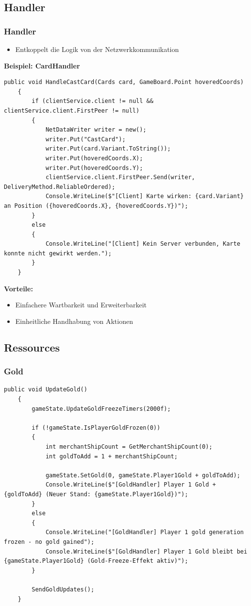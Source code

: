 \documentclass{beamer}
\begin{document}
\subsection{Handler}
\begin{frame}[fragile]
\frametitle{Handler}
  \begin{itemize}
    \item Entkoppelt die Logik von der Netzwerkkommunikation
  \end{itemize}
  \textbf{Beispiel: CardHandler}
  \begin{lstlisting}[language=CSharp, basicstyle=\ttfamily\tiny, breaklines=true]
    public void HandleCastCard(Cards card, GameBoard.Point hoveredCoords)
    {
        if (clientService.client != null && clientService.client.FirstPeer != null)
        {
            NetDataWriter writer = new();
            writer.Put("CastCard");
            writer.Put(card.Variant.ToString());
            writer.Put(hoveredCoords.X);
            writer.Put(hoveredCoords.Y);
            clientService.client.FirstPeer.Send(writer, DeliveryMethod.ReliableOrdered);
            Console.WriteLine($"[Client] Karte wirken: {card.Variant} an Position ({hoveredCoords.X}, {hoveredCoords.Y})");
        }
        else
        {
            Console.WriteLine("[Client] Kein Server verbunden, Karte konnte nicht gewirkt werden.");
        }
    }
  \end{lstlisting}
  \textbf{Vorteile:}
  \begin{itemize}
    \item Einfachere Wartbarkeit und Erweiterbarkeit
    \item Einheitliche Handhabung von Aktionen
  \end{itemize} 
\end{frame}

\subsection{Ressources}
\begin{frame}[fragile]
\frametitle{Gold}
\begin{lstlisting}[language=CSharp, basicstyle=\ttfamily\tiny, breaklines=true]
    public void UpdateGold()
    {
        gameState.UpdateGoldFreezeTimers(2000f);

        if (!gameState.IsPlayerGoldFrozen(0))
        {
            int merchantShipCount = GetMerchantShipCount(0);
            int goldToAdd = 1 + merchantShipCount; 
            
            gameState.SetGold(0, gameState.Player1Gold + goldToAdd);
            Console.WriteLine($"[GoldHandler] Player 1 Gold +{goldToAdd} (Neuer Stand: {gameState.Player1Gold})");
        }
        else
        {
            Console.WriteLine("[GoldHandler] Player 1 gold generation frozen - no gold gained");
            Console.WriteLine($"[GoldHandler] Player 1 Gold bleibt bei {gameState.Player1Gold} (Gold-Freeze-Effekt aktiv)");
        }

        SendGoldUpdates();
    }
  \end{lstlisting}
\end{frame}
\end{document}
